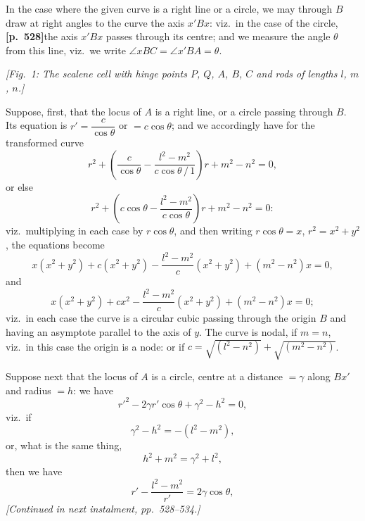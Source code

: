 \documentclass[11pt,a4paper]{article}
\begin{document}
In the case where the given curve is a right line or a circle, we may through $B$ draw at right angles to the curve the axis $x'Bx$: viz.\ in the case of the circle, \noindent\textbf{[p.~528]}\quad the axis $x'Bx$ passes through its centre; and we measure the angle $\theta$ from this line, viz.\ we write $\angle xBC = \angle x'BA = \theta$.

\begin{center}
\textit{[Fig.~1: The scalene cell with hinge points $P$, $Q$, $A$, $B$, $C$ and rods of lengths $l$, $m$, $n$.]}
\end{center}

Suppose, first, that the locus of $A$ is a right line, or a circle passing through $B$. Its equation is $r' = \dfrac{c}{\cos\theta}$ or $= c\cos\theta$; and we accordingly have for the transformed curve
\[
r^{2} + \left(\frac{c}{\cos\theta} - \frac{l^{2} - m^{2}}{c\cos\theta\,/\,1}\right)r + m^{2} - n^{2} = 0,
\]
or else
\[
r^{2} + \left(c\cos\theta - \frac{l^{2} - m^{2}}{c\cos\theta}\right)r + m^{2} - n^{2} = 0:
\]
viz.\ multiplying in each case by $r\cos\theta$, and then writing $r\cos\theta = x$, $r^{2} = x^{2} + y^{2}$, the equations become
\[
x(x^{2} + y^{2}) + c(x^{2} + y^{2}) - \frac{l^{2} - m^{2}}{c}(x^{2} + y^{2}) + (m^{2} - n^{2})x = 0,
\]
and
\[
x(x^{2} + y^{2}) + cx^{2} - \frac{l^{2} - m^{2}}{c}(x^{2} + y^{2}) + (m^{2} - n^{2})x = 0;
\]
viz.\ in each case the curve is a circular cubic passing through the origin $B$ and having an asymptote parallel to the axis of $y$. The curve is nodal, if $m = n$, viz.\ in this case the origin is a node: or if $c = \sqrt{(l^{2} - n^{2})} + \sqrt{(m^{2} - n^{2})}$.

Suppose next that the locus of $A$ is a circle, centre at a distance $= \gamma$ along $Bx'$ and radius $= h$: we have
\[
r'^{2} - 2\gamma r'\cos\theta + \gamma^{2} - h^{2} = 0,
\]
viz.\ if
\[
\gamma^{2} - h^{2} = -(l^{2} - m^{2}),
\]
or, what is the same thing,
\[
h^{2} + m^{2} = \gamma^{2} + l^{2},
\]
then we have
\[
r' - \frac{l^{2} - m^{2}}{r'} = 2\gamma\cos\theta,
\]
\textit{[Continued in next instalment, pp.~528--534.]}
\end{document}
